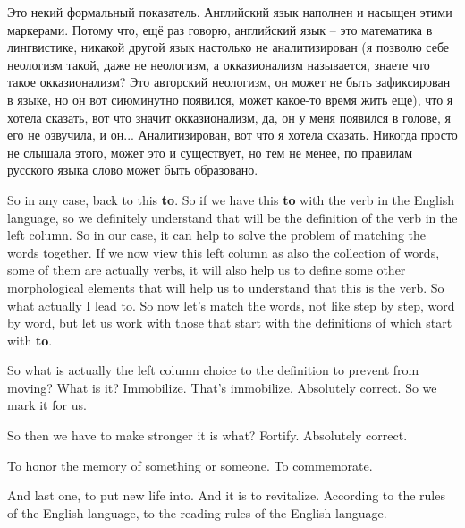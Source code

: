 \documentclass[main.tex]{subfiles}
\begin{document}
Это некий формальный показатель.
Английский язык наполнен и насыщен этими маркерами.
Потому что, ещё раз говорю, английский язык -- это математика в лингвистике, никакой другой язык настолько не аналитизирован (я позволю себе неологизм такой, даже не неологизм, а окказионализм называется, знаете что такое окказионализм? Это авторский неологизм, он может не быть зафиксирован в языке, но он вот сиюминутно появился, может какое-то время жить еще), что я хотела сказать, вот что значит окказионализм, да, он у меня появился в голове, я его не озвучила, и он...
Аналитизирован, вот что я хотела сказать.
Никогда просто не слышала этого, может это и существует, но тем не менее, по правилам русского языка слово может быть образовано.

So in any case, back to this \textbf{to}. 
So if we have this \textbf{to} with the verb in the English language, so we definitely understand that will be the definition of the verb in the left column.
So in our case, it can help to solve the problem of matching the words together.
If we now view this left column as also the collection of words, some of them are actually verbs, it will also help us to define some other morphological elements that will help us to understand that this is the verb.
So what actually I lead to.
So now let's match the words, not like step by step, word by word, but let us work with those that start with the definitions of which start with \textbf{to}.

So what is actually the left column choice to the definition to prevent from moving? What is it?
Immobilize.
That's immobilize.
Absolutely correct.
So we mark it for us.

So then we have to make stronger it is what?
Fortify. Absolutely correct.

To honor the memory of something or someone.
To commemorate.

And last one, to put new life into.
And it is to revitalize.
According to the rules of the English language, to the reading rules of the English language.
\end{document}
